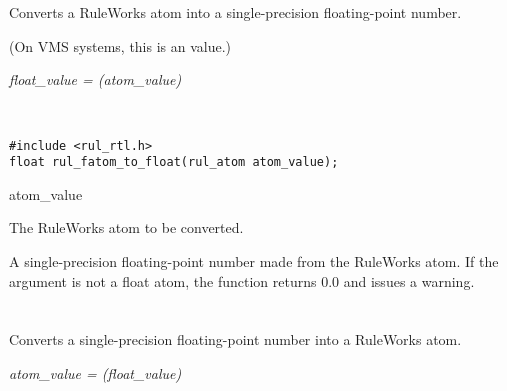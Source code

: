 \section*{}

Converts a RuleWorks  atom into a single-precision floating-point
number.

(On VMS systems, this is an  value.)

\Syntax

\it{float\_value} = (\it{atom\_value})

\begin{args}
   \\
\end{args}

\CBinding
\begin{verbatim}
#include <rul_rtl.h>
float rul_fatom_to_float(rul_atom atom_value);
\end{verbatim}

\begin{argument}
\item[atom\_value]

  The RuleWorks  atom to be converted.
\end{argument}

\ReturnValue

A single-precision floating-point number made from the RuleWorks atom.
If the argument is not a float atom, the function returns 0.0 and
issues a warning.

\begin{seealso}
\end{seealso}

\section*{}

Converts a single-precision floating-point number into a RuleWorks
 atom.

\Syntax

\it{atom\_value} = (\it{float\_value})

\begin{args}
 \\
\end{args}

